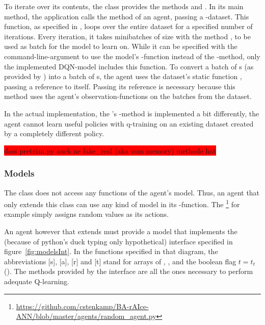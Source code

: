 To iterate over its contents, the class  provides the methods  and . In its main method, the application  calls the method  of an agent, passing a -dataset. This function, as specified in , loops over the entire dataset for a specified number of iterations. Every iteration, it takes minibatches of size  with the method , to be used as batch for the model to learn on. While it can be specified with the command-line-argument  to use the model's -function instead of the -method, only the implemented DQN-model includes this function. To convert a batch of s (as provided by ) into a batch of s, the agent uses the dataset's static function , passing a reference to itself. Passing its reference is necessary because this method uses the agent's observation-functions on the batches from the dataset.

In the actual implementation, the 's -method is implemented a bit differently, the agent cannot learn useful policies with q-training on an existing dataset created by a completely different policy.


\colorbox{red}{dass pretrian.py auch ne fake\_real (aka vom memory) methode hat}


\subsubsection{Models}

The class  does not access any functions of the agent's model. Thus, an agent that only extends this class can use any kind of model in its -function. The \footnote{\url{https://github.com/cstenkamp/BA-rAIce-ANN/blob/master/agents/random\_agent.py}} for example simply assigns random values as its actions.

An agent however that extends  must provide a model that implements the (because of python's duck typing only hypothetical) interface specified in figure~\ref{fig:modelsInt}. In the functions specified in that diagram, the abbreviations [s], [a], [r] and [t] stand for arrays of , ,  and the boolean flag $t = t_t$ (). The methods provided by the interface are all the ones necessary to perform adequate Q-learning.

